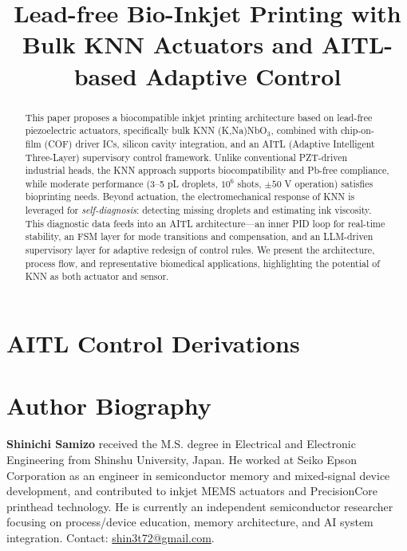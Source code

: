\documentclass[conference]{IEEEtran}
\title{Lead-free Bio-Inkjet Printing with Bulk KNN Actuators and AITL-based Adaptive Control}
\author{%
  \IEEEauthorblockN{Shinichi Samizo}
  \IEEEauthorblockA{Independent Semiconductor Researcher\\
  Former Engineer at Seiko Epson Corporation\\
  Email: \href{mailto:shin3t72@gmail.com}{shin3t72@gmail.com}\\
  GitHub: \url{https://github.com/Samizo-AITL}}%
}
\begin{document}
\maketitle

\begin{abstract}
This paper proposes a biocompatible inkjet printing architecture based on
lead-free piezoelectric actuators, specifically bulk KNN (K,Na)NbO$_3$, combined
with chip-on-film (COF) driver ICs, silicon cavity integration, and
an AITL (Adaptive Intelligent Three-Layer) supervisory control framework.
Unlike conventional PZT-driven industrial heads, the KNN approach supports
biocompatibility and Pb-free compliance, while moderate performance
(3--5 pL droplets, $10^6$ shots, $\pm50$ V operation) satisfies bioprinting needs.
Beyond actuation, the electromechanical response of KNN is leveraged for
\emph{self-diagnosis}: detecting missing droplets and estimating ink viscosity.
This diagnostic data feeds into an AITL architecture---an inner PID loop for
real-time stability, an FSM layer for mode transitions and compensation,
and an LLM-driven supervisory layer for adaptive redesign of control rules.
We present the architecture, process flow, and representative biomedical
applications, highlighting the potential of KNN as both actuator and sensor.
\end{abstract}







\appendices
\section{AITL Control Derivations}


\nocite{Saito2004KNN,Dubois2019BioIJ}



\section*{Author Biography}
\textbf{Shinichi Samizo} received the M.S. degree in Electrical and Electronic
Engineering from Shinshu University, Japan. He worked at Seiko Epson
Corporation as an engineer in semiconductor memory and mixed-signal
device development, and contributed to inkjet MEMS actuators and
PrecisionCore printhead technology. He is currently an independent
semiconductor researcher focusing on process/device education, memory
architecture, and AI system integration. Contact:
\href{mailto:shin3t72@gmail.com}{shin3t72@gmail.com}.
\end{document}
